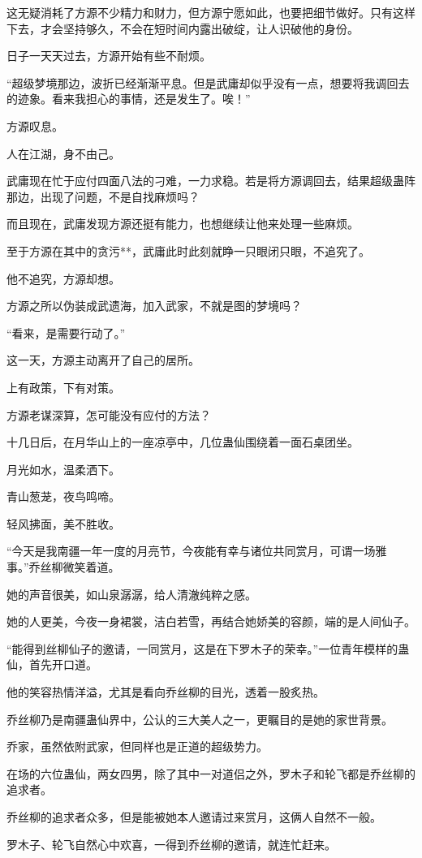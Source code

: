 \begin{this_body}
这无疑消耗了方源不少精力和财力，但方源宁愿如此，也要把细节做好。只有这样下去，才会坚持够久，不会在短时间内露出破绽，让人识破他的身份。

日子一天天过去，方源开始有些不耐烦。

“超级梦境那边，波折已经渐渐平息。但是武庸却似乎没有一点，想要将我调回去的迹象。看来我担心的事情，还是发生了。唉！”

方源叹息。

人在江湖，身不由己。

武庸现在忙于应付四面八法的刁难，一力求稳。若是将方源调回去，结果超级蛊阵那边，出现了问题，不是自找麻烦吗？

而且现在，武庸发现方源还挺有能力，也想继续让他来处理一些麻烦。

至于方源在其中的贪污**，武庸此时此刻就睁一只眼闭只眼，不追究了。

他不追究，方源却想。

方源之所以伪装成武遗海，加入武家，不就是图的梦境吗？

“看来，是需要行动了。”

这一天，方源主动离开了自己的居所。

上有政策，下有对策。

方源老谋深算，怎可能没有应付的方法？

十几日后，在月华山上的一座凉亭中，几位蛊仙围绕着一面石桌团坐。

月光如水，温柔洒下。

青山葱茏，夜鸟鸣啼。

轻风拂面，美不胜收。

“今天是我南疆一年一度的月亮节，今夜能有幸与诸位共同赏月，可谓一场雅事。”乔丝柳微笑着道。

她的声音很美，如山泉潺潺，给人清澈纯粹之感。

她的人更美，今夜一身裙裳，洁白若雪，再结合她娇美的容颜，端的是人间仙子。

“能得到丝柳仙子的邀请，一同赏月，这是在下罗木子的荣幸。”一位青年模样的蛊仙，首先开口道。

他的笑容热情洋溢，尤其是看向乔丝柳的目光，透着一股炙热。

乔丝柳乃是南疆蛊仙界中，公认的三大美人之一，更瞩目的是她的家世背景。

乔家，虽然依附武家，但同样也是正道的超级势力。

在场的六位蛊仙，两女四男，除了其中一对道侣之外，罗木子和轮飞都是乔丝柳的追求者。

乔丝柳的追求者众多，但是能被她本人邀请过来赏月，这俩人自然不一般。

罗木子、轮飞自然心中欢喜，一得到乔丝柳的邀请，就连忙赶来。


\end{this_body}
